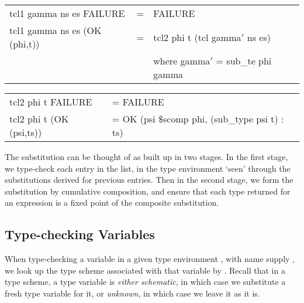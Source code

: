 \begin{mlcoded}
    \begin{tabular}{lll}
    tcl1 gamma ns es FAILURE      &= &FAILURE \\
    tcl1 gamma ns es (OK (phi,t)) &= &tcl2 phi t (tcl gamma$'$ ns es) \\
    & &where gamma$'$ = sub\_te phi gamma
    \end{tabular}
\end{mlcoded}

\begin{mlcoded}
    \begin{tabular}{ll}
        tcl2 phi t FAILURE          & = FAILURE \\
        tcl2 phi t (OK (psi,ts))    & = OK (psi \$scomp phi, (sub\_type psi t) : ts)
    \end{tabular}
\end{mlcoded}
The substitution can be thought of as built up in two stages. In the first stage,
we type-check each entry in the list, in the type environment `seen' through
the substitutions derived for previous entries. Then in the second stage, we
form the substitution by cumulative composition, and ensure that each type
returned for an expression is a fixed point of the composite substitution.

\subsection{Type-checking Variables}

When type-checking a variable  in a given type environment , with
name supply , we look up the type scheme associated with that variable by
. Recall that in a type scheme, a type variable is \textit{either schematic}, in
which case we substitute a fresh type variable for it, or \textit{unknown}, in which case
we leave it as it is.

